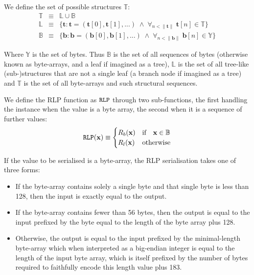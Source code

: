 \documentclass[9pt,oneside]{amsart}
\begin{document}
We define the set of possible structures $\mathbb{T}$:
\begin{eqnarray}
\mathbb{T} & \equiv & \mathbb{L} \cup \mathbb{B} \\
\mathbb{L} & \equiv & \{ \mathbf{t}: \mathbf{t} = ( \mathbf{t}[0], \mathbf{t}[1], ... ) \; \wedge \; \forall_{n < \lVert \mathbf{t} \rVert} \; \mathbf{t}[n] \in \mathbb{T} \} \\
\mathbb{B} & \equiv & \{ \mathbf{b}: \mathbf{b} = ( \mathbf{b}[0], \mathbf{b}[1], ... ) \; \wedge \; \forall_{n < \lVert \mathbf{b} \rVert} \; \mathbf{b}[n] \in \mathbb{Y} \}
\end{eqnarray}

Where $\mathbb{Y}$ is the set of bytes. Thus $\mathbb{B}$ is the set of all sequences of bytes (otherwise known as byte-arrays, and a leaf if imagined as a tree), $\mathbb{L}$ is the set of all tree-like (sub-)structures that are not a single leaf (a branch node if imagined as a tree) and $\mathbb{T}$ is the set of all byte-arrays and such structural sequences.

We define the RLP function as $\mathtt{\tiny RLP}$ through two sub-functions, the first handling the instance when the value is a byte array, the second when it is a sequence of further values:
\begin{equation}
\mathtt{\tiny RLP}(\mathbf{x}) \equiv \begin{cases} R_b(\mathbf{x}) & \text{if} \quad \mathbf{x} \in \mathbb{B} \\ R_l(\mathbf{x}) & \text{otherwise} \end{cases}
\end{equation}

If the value to be serialised is a byte-array, the RLP serialisation takes one of three forms:

\begin{itemize}
\item If the byte-array contains solely a single byte and that single byte is less than 128, then the input is exactly equal to the output.
\item If the byte-array contains fewer than 56 bytes, then the output is equal to the input prefixed by the byte equal to the length of the byte array plus 128.
\item Otherwise, the output is equal to the input prefixed by the minimal-length byte-array which when interpreted as a big-endian integer is equal to the length of the input byte array, which is itself prefixed by the number of bytes required to faithfully encode this length value plus 183.
\end{itemize}
\end{document}
